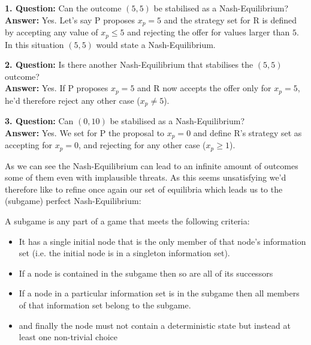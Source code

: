 \begin{example}
	\textbf{1. Question:} Can the outcome $(5, 5)$ be stabilised as a Nash-Equilibrium? \\
	\textbf{Answer:} Yes. Let's say P proposes $x_{p} = 5$ and the strategy set for R is defined by accepting any value of $x_{p} \leq 5$ and rejecting the offer for values larger than $5$. \\
		In this situation $(5, 5)$ would state a Nash-Equilibrium.


	\textbf{2. Question:} Is there another Nash-Equilibrium that stabilises the $(5, 5)$ outcome? \\
	\textbf{Answer:} Yes. If P proposes $x_{p} = 5$ and R now accepts the offer only for $x_{p} = 5$, he'd therefore reject any other case ($x_{p} \neq 5$). 
	
	
	\textbf{3. Question:} Can $(0, 10)$ be stabilised as a Nash-Equilibrium? \\
	\textbf{Answer:} Yes. We set for P the proposal to $x_{p} = 0$ and define R's strategy set as accepting for $x_{p} = 0$, and rejecting for any other case ($x_{p} \geq 1$). 
\end{example}
As we can see the Nash-Equilibrium can lead to an infinite amount of outcomes some of them even with implausible threats. As this seems unsatisfying we'd therefore like to refine once again our set of equilibria which leads us to the (subgame) perfect Nash-Equilibrium:

\begin{definition}[Subgame] 
	A subgame is any part of a game that meets the following criteria:
	\begin{itemize}
		\item It has a single initial node that is the only member of that node's information set (i.e. the initial node is in a singleton information set).
		\item If a node is contained in the subgame then so are all of its successors
		\item If a node in a particular information set is in the subgame then all members of that information set belong to the subgame.
		\item and finally the node must not contain a deterministic state but instead at least one non-trivial choice
	\end{itemize}
\end{definition}

